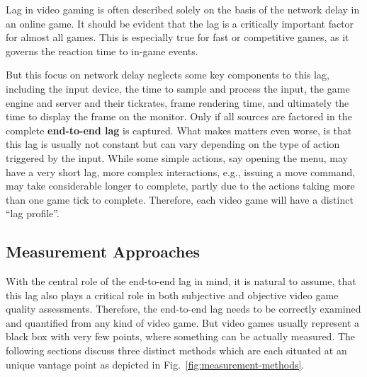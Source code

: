 Lag in video gaming is often described solely on the basis of the network delay in an online game. It should be evident that the lag is a critically important factor for almost all games. This is especially true for fast or competitive games, as it governs the reaction time to in-game events.

But this focus on network delay neglects some key components to this lag, including the input device, the time to sample and process the input, the game engine and server and their tickrates, frame rendering time, and ultimately the time to display the frame on the monitor. Only if all sources are factored in the complete \textbf{end-to-end lag} is captured. What makes matters even worse, is that this lag is usually not constant but can vary depending on the type of action triggered by the input. While some simple actions, say opening the menu, may have a very short lag, more complex interactions, e.g., issuing a move command, may take considerable longer to complete, partly due to the actions taking more than one game tick to complete. Therefore, each video game will have a distinct ``lag profile''.  




\subsection{Measurement Approaches}
\label{sec:measurementapproaches}

With the central role of the end-to-end lag in mind, it is natural to assume, that this lag also plays a critical role in both subjective and objective video game quality assessments. Therefore, the end-to-end lag needs to be correctly examined and quantified from any kind of video game. But video games usually represent a black box with very few points, where something can be actually measured. The following sections discuss three distinct methods which are each situated at an unique vantage point as depicted in Fig.~\ref{fig:measurement-methods}.

